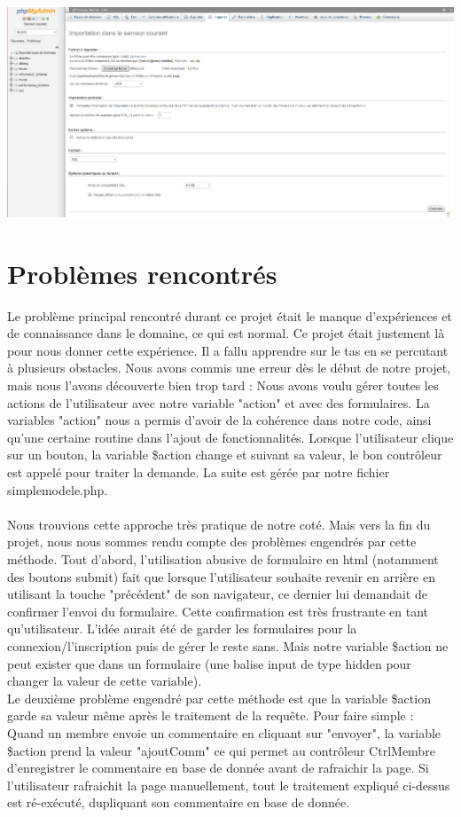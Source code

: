 \documentclass{article}
\begin{document}
    \includegraphics[width=\textwidth]{images/importbdd.PNG}\\

    \section{Problèmes rencontrés}
    Le problème principal rencontré durant ce projet était le manque d'expériences et de connaissance dans le domaine, ce qui est normal.
    Ce projet était justement là pour nous donner cette expérience. Il a fallu apprendre sur le tas en se percutant à plusieurs obstacles.
    Nous avons commis une erreur dès le début de notre projet, mais nous l'avons découverte bien trop tard : Nous avons voulu gérer toutes
    les actions de l'utilisateur avec notre variable "action" et avec des formulaires. La variables "action" nous a permis d'avoir de la
    cohérence dans notre code, ainsi qu'une certaine routine dans l'ajout de fonctionnalités. Lorsque l'utilisateur clique sur un bouton,
    la variable \$action change et suivant sa valeur, le bon contrôleur est appelé pour traiter la demande. La suite est gérée par notre
    fichier simplemodele.php.\\\\
    Nous trouvions cette approche très pratique de notre coté. Mais vers la fin du projet, nous nous sommes rendu compte des problèmes
    engendrés par cette méthode. Tout d'abord, l'utilisation abusive de formulaire en html (notamment des boutons submit) fait que lorsque
    l'utilisateur souhaite revenir en arrière en utilisant la touche "précédent" de son navigateur, ce dernier lui demandait de confirmer
    l'envoi du formulaire. Cette confirmation est très frustrante en tant qu'utilisateur. L'idée aurait été de garder les formulaires
    pour la connexion/l'inscription puis de gérer le reste sans. Mais notre variable \$action ne peut exister que dans un formulaire 
    (une balise input de type hidden pour changer la valeur de cette variable).\\
    Le deuxième problème engendré par cette méthode est que la variable \$action garde sa valeur même après le traitement de la requête.
    Pour faire simple : Quand un membre envoie un commentaire en cliquant sur "envoyer", la variable \$action prend la valeur "ajoutComm"
    ce qui permet au contrôleur CtrlMembre d'enregistrer le commentaire en base de donnée avant de rafraichir la page. Si l'utilisateur
    rafraichit la page manuellement, tout le traitement expliqué ci-dessus est ré-exécuté, dupliquant son commentaire en base de donnée.
\end{document}
